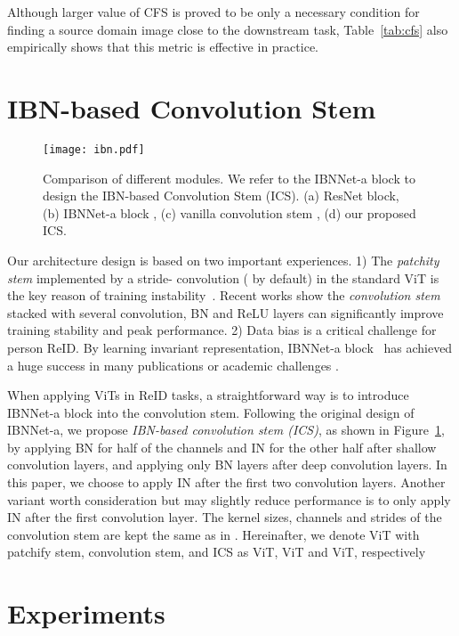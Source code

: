 \documentclass[10pt,twocolumn,letterpaper]{article}
\begin{document}
Although larger value of CFS is proved to be only a necessary condition for finding a source domain image close to the downstream task, Table~\ref{tab:cfs} also empirically shows that this metric is effective in practice.

\section{IBN-based Convolution Stem}
\begin{figure}[htb]
    \centering
    \vspace{-1em}
	\texttt{[image: ibn.pdf]}
	\caption{Comparison of different modules. We refer to the IBNNet-a block to design the IBN-based Convolution Stem (ICS). (a) ResNet block, (b) IBNNet-a block \cite{ibnnet}, (c) vanilla convolution stem \cite{conv_stem}, (d) our proposed ICS.} 
	\label{fig:ibn}
\end{figure}

Our architecture design is based on two important experiences. 1) The \textit{patchity stem} implemented by a stride-  convolution ( by default) in the standard ViT is the key reason of training instability~\cite{chen2021mocov3}. Recent works show the \textit{convolution stem}~\cite{conv_stem,wang2021scaled} stacked with several convolution, BN and ReLU layers can significantly improve training stability and peak performance. 2) Data bias is a critical challenge for person ReID. By learning invariant representation, IBNNet-a block~\cite{ibnnet} has achieved a huge success in many publications or academic challenges \cite{luo2019strong, dai2021cluster}.
    
When applying ViTs in ReID tasks, a straightforward way is to introduce IBNNet-a block into the convolution stem. Following the original design of IBNNet-a, we propose \textit{IBN-based convolution stem (ICS)}, as shown in Figure~\ref{fig:ibn}, by applying BN for half of the channels and IN for the other half after shallow convolution layers, and applying only BN layers after deep convolution layers. In this paper, we choose to apply IN after the first two convolution layers. Another variant worth consideration but may slightly reduce performance is to only apply IN after the first convolution layer. The kernel sizes, channels and strides of the convolution stem are kept the same as in \cite{conv_stem}. Hereinafter, we denote ViT with patchify stem, convolution stem, and ICS as ViT, ViT and ViT, respectively

\section{Experiments}
\end{document}
